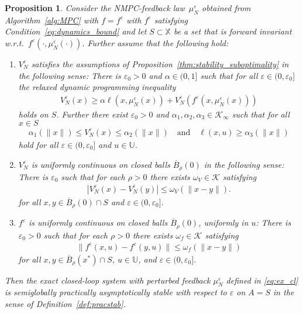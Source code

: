 \documentclass{article}
\numberwithin{equation}{section}
\newtheorem{proposition}[theorem]{Proposition}
\newcommand{\bX}{\mathbb X}
\begin{document}
	\begin{proposition}\label{thm:PAS}
		Consider the NMPC-feedback law~$\mu_N^\varepsilon$ obtained from Algorithm~\ref{alg:MPC} with $f = f^\varepsilon$ with $f^{\varepsilon}$ satisfying Condition~\eqref{eq:dynamics_bound} and let $S \subset \bX$ be a set that is forward invariant w.r.t.\ $f^\varepsilon(\cdot,\mu^\varepsilon_N(\cdot))$.     Further assume that the following hold:
		\begin{enumerate}
			\item [(i)] $V^\varepsilon_N$ satisfies the assumptions of Proposition~\ref{thm:stability_suboptimality} in the following sense: 
			There is $\varepsilon_0>0$ and $\alpha \in (0,1]$ such that for all $\varepsilon\in (0,\varepsilon_0]$ the relaxed dynamic programming inequality
			\begin{align*}
			V_N^\varepsilon(x) \geq \alpha \ell(x,\mu^\varepsilon_N(x)) + V_N^\varepsilon(f^\varepsilon(x,\mu^\varepsilon_N(x)))
			\end{align*}
			holds on $S$. 
			Further there exist $\varepsilon_0>0$ and $\alpha_1,\alpha_2,\alpha_3 \in \mathcal{K}_\infty$ such that for all $x \in S$
			\begin{align*}
			\alpha_1(\|x\|) \leq V_N^\varepsilon(x) \leq \alpha_2(\|x\|) \quad \mathrm{and}\quad \ell(x,u) \geq \alpha_3(\|x\|)
			\end{align*}
			hold for all $\varepsilon \in (0,\varepsilon_0]$ and $u\in \mathbb{U}$.
			\item [(ii)] $V^\varepsilon_N$ is uniformly continuous on closed balls $\overline{B}_\rho(0)$ in the following sense: 
			There is $\varepsilon_0$ such that for each $\rho >0$ there exists $\omega_V\in \mathcal{K}$ satisfying
			\begin{align*}
			|V^\varepsilon_N(x)-V^\varepsilon_N(y)| \leq \omega_V(\|x-y\|).
			\end{align*}
			for all $x,y \in \overline{B}_\rho(0) \cap S$ and $\varepsilon\in (0,\varepsilon_0]$.
			\item [(iii)] $f^\varepsilon$ is uniformly continuous on closed balls $\overline{B}_\rho(0)$, uniformly in $u$: 
			There is $\varepsilon_0>0$ such that for each $\rho > 0$ there exists $\omega_f\in \mathcal{K}$ satisfying
			\begin{align*}
			\|f^\varepsilon(x,u)-f^\varepsilon(y,u)\| \leq \omega_f(\|x-y\|)
			\end{align*}
			for all $x,y \in \overline{B}_\rho(x^*) \cap S$, $u\in \mathbb{U}$, and $\varepsilon\in (0,\varepsilon_0]$.
		\end{enumerate}
		Then the exact closed-loop system with perturbed feedback $\mu_N^\varepsilon$ defined in \eqref{eq:ex_cl} is semiglobally
		practically asymptotically stable with respect to $\varepsilon$ on $A = S$ in the sense of Definition~\ref{def:pracstab}.
	\end{proposition}
	
\end{document}
